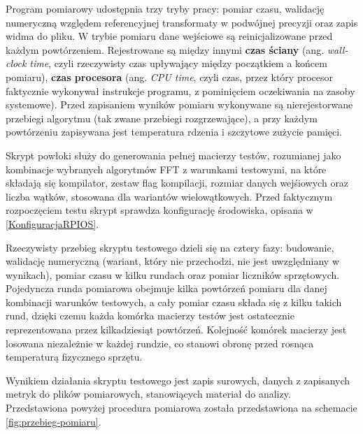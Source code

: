 Program pomiarowy udostępnia trzy tryby pracy: pomiar czasu, walidację
numeryczną względem referencyjnej transformaty w podwójnej precyzji oraz
zapis widma do pliku. W trybie pomiaru dane wejściowe są 
reinicjalizowane przed każdym powtórzeniem. Rejestrowane są między innymi \textbf{czas ściany} (ang. \textit{wall-clock time}, czyli
rzeczywisty czas upływający między początkiem a końcem pomiaru),
\textbf{czas procesora} (ang. \textit{CPU time}, czyli czas, przez który
procesor faktycznie wykonywał instrukcje programu, z pominięciem oczekiwania
na zasoby systemowe). Przed zapisaniem wyników pomiaru wykonywane są nierejestorwane przebiegi
algorytmu (tak zwane przebiegi rozgrzewające), a przy każdym powtórzeniu zapisywana jest temperatura rdzenia
i szczytowe zużycie pamięci.

Skrypt powłoki służy do generowania pełnej macierzy testów, rozumianej jako
kombinacje wybranych algorytmów FFT z warunkami testowymi, na które składają
się kompilator, zestaw flag kompilacji, rozmiar danych wejśiowych oraz liczba
wątków, stosowana dla wariantów wielowątkowych. Przed faktycznym rozpoczęciem testu skrypt sprawdza konfigurację środowiska,
opisana w \cref{KonfiguracjaRPIOS}.  

Rzeczywisty przebieg skryptu testowego dzieli się
na cztery fazy: budowanie, walidację numeryczną (wariant, który nie
przechodzi, nie jest uwzględniany w wynikach), pomiar czasu w kilku rundach
oraz pomiar liczników sprzętowych. Pojedyncza runda pomiarowa obejmuje kilka
powtórzeń pomiaru dla danej kombinacji warunków testowych, a cały pomiar
czasu składa się z kilku takich rund, dzięki czemu każda komórka macierzy
testów jest ostatecznie reprezentowana przez kilkadziesiąt powtórzeń.
Kolejność komórek macierzy jest losowana niezależnie w każdej rundzie, co
stanowi obronę przed rosnąca temperaturą fizycznego sprzętu.

Wynikiem działania skryptu testowego jest zapis surowych, danych z zapisanych metryk do plików pomiarowych, stanowiących materiał do analizy.
\\Przedstawiona powyżej procedura pomiarowa została przedstawiona na schemacie \cref{fig:przebieg-pomiaru}.

